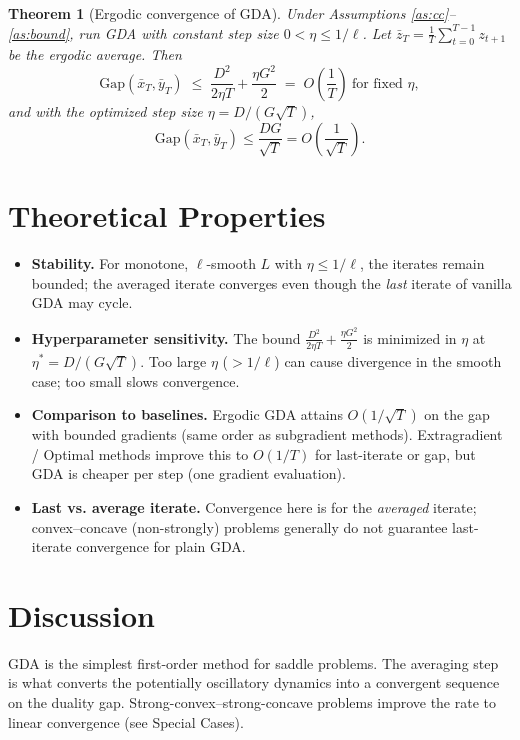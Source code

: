 \documentclass[11pt]{article}
\newtheorem{theorem}{Theorem}
\begin{document}
\begin{theorem}[Ergodic convergence of GDA]\label{thm:main}
Under Assumptions \ref{as:cc}--\ref{as:bound}, run GDA with constant step size
$0<\eta\le 1/\ell$. Let $\bar z_T = \frac1T\sum_{t=0}^{T-1} z_{t+1}$ be the
ergodic average. Then
\[
\mathrm{Gap}(\bar x_T,\bar y_T)
\;\le\; \frac{D^2}{2\eta T} + \frac{\eta G^2}{2}
\;=\; O\!\left(\frac{1}{T}\right) \ \text{for fixed } \eta,
\]
and with the optimized step size $\eta = D/(G\sqrt{T})$,
\[
\mathrm{Gap}(\bar x_T,\bar y_T)\le \frac{D G}{\sqrt{T}} = O\!\left(\frac{1}{\sqrt{T}}\right).
\]
\end{theorem}

\section*{Theoretical Properties}

\begin{itemize}
\item \textbf{Stability.} For monotone, $\ell$-smooth $L$ with $\eta\le 1/\ell$,
the iterates remain bounded; the averaged iterate converges even though the
\emph{last} iterate of vanilla GDA may cycle.
\item \textbf{Hyperparameter sensitivity.} The bound $\frac{D^2}{2\eta T}+\frac{\eta G^2}{2}$
is minimized in $\eta$ at $\eta^*=D/(G\sqrt T)$. Too large $\eta$ ($>1/\ell$) can
cause divergence in the smooth case; too small slows convergence.
\item \textbf{Comparison to baselines.} Ergodic GDA attains $O(1/\sqrt T)$ on the gap
with bounded gradients (same order as subgradient methods). Extragradient /
Optimal methods improve this to $O(1/T)$ for last-iterate or gap, but GDA is
cheaper per step (one gradient evaluation).
\item \textbf{Last vs. average iterate.} Convergence here is for the \emph{averaged}
iterate; convex--concave (non-strongly) problems generally do not guarantee
last-iterate convergence for plain GDA.
\end{itemize}

\section*{Discussion}

GDA is the simplest first-order method for saddle problems. The averaging step is
what converts the potentially oscillatory dynamics into a convergent sequence
on the duality gap. Strong-convex--strong-concave problems improve the rate to
linear convergence (see Special Cases).
\end{document}
